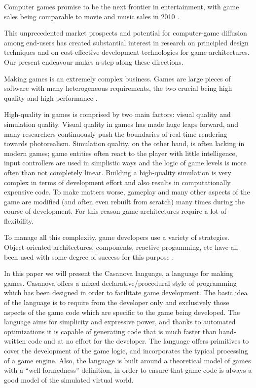 
Computer games promise to be the next frontier in entertainment, with game sales being comparable to movie and music sales in 2010 \cite{ESA}. 

This unprecedented market prospects and potential for computer-game diffusion among end-users has created substantial interest in research on principled design techniques and on cost-effective development technologies for game architectures. Our present endeavour makes a step along these directions. 

Making games is an extremely complex business. Games are large pieces of software with many heterogeneous requirements, the two crucial being high quality and high performance \cite{GAME_OPT}. 


High-quality in games is comprised by two main factors: visual quality and simulation quality. Visual quality in games has made huge leaps forward, and many researchers continuously push the boundaries of real-time rendering towards photorealism. Simulation quality, on the other hand, is often lacking in modern games; game entities often react to the player with little intelligence, input controllers are used in simplistic ways and the logic of game levels is more often than not completely linear. Building a high-quality simulation is very complex in terms of development effort and also results in computationally expensive code. To make matters worse, gameplay and many other aspects of the game are modified (and often even rebuilt from scratch) many times during the course of development. For this reason game architectures require a lot of flexibility.

To manage all this complexity, game developers use a variety of strategies. Object-oriented architectures, components, reactive progamming, etc have all been used with some degree of success for this purpose \cite{COMPONENTS1,GAMEOBJECTS,FRP}. 

In this paper we will present the Casanova language, a language for making games. Casanova offers a mixed declarative/procedural style of programming which has been designed in order to facilitate game development. The basic idea of the language is to require from the developer only and exclusively those aspects of the game code which are specific to the game being developed. The language aims for simplicity and expressive power, and thanks to automated optimizations it is capable of generating code that is much faster than hand-written code and at no effort for the developer. The language offers primitives to cover the development of the game logic, and incorporates the typical processing of a game engine. Also, the language is built around a theoretical model of games with a ``well-formedness'' definition, in order to ensure that game code is always a good model of the simulated virtual world.

